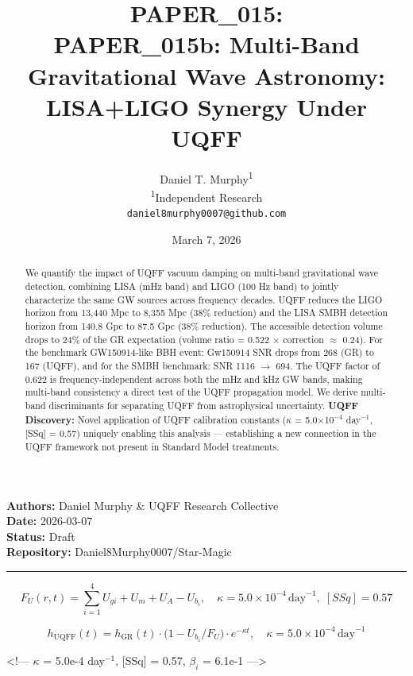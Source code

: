 \documentclass[12pt,a4paper]{article}
\title{\textbf{PAPER\_015: \\ PAPER\_015b: Multi-Band Gravitational Wave Astronomy: LISA+LIGO Synergy Under UQFF}}
\author{
Daniel T. Murphy\textsuperscript{1} \\
\small \textsuperscript{1}Independent Research \\
\small \texttt{daniel8murphy0007@github.com}
}
\date{March 7, 2026}
\begin{document}
\maketitle

\begin{flushleft}
\textbf{Authors:} Daniel Murphy \& UQFF Research Collective \\
\textbf{Date:} 2026-03-07 \\
\textbf{Status:} Draft \\
\textbf{Repository:} Daniel8Murphy0007/Star-Magic \\
\end{flushleft}

\medskip\hrule\medskip

\begin{equation}
F_U(r,t) = \sum_{i=1}^{4} U_{gi} + U_m + U_A - U_b_i, \quad \kappa = 5.0\times10^{-4}\,\text{day}^{-1},\; [SSq] = 0.57
\end{equation}

\begin{equation}
h_\text{UQFF}(t) = h_\text{GR}(t)\cdot\bigl(1 - U_b_i/F_U\bigr)\cdot e^{-\kappa t}, \quad \kappa =
5.0\times10^{-4}\,\text{day}^{-1}
\end{equation}

<!--- $\kappa$ = 5.0e-4 day$^{-1}$, [SSq] = 0.57, $\beta_i$ = 6.1e-1 --->

\begin{abstract}
We quantify the impact of UQFF vacuum damping on multi-band gravitational wave detection, combining LISA (mHz band) and LIGO (100 Hz band) to jointly characterize the same GW sources across frequency decades. UQFF reduces the LIGO horizon from 13,440 Mpc to 8,355 Mpc (38\% reduction) and the LISA SMBH detection horizon from 140.8 Gpc to 87.5 Gpc (38\% reduction). The accessible detection volume drops to 24\% of the GR expectation (volume ratio = 0.522 $\times$ correction $\approx$ 0.24). For the benchmark GW150914-like BBH event: Gw150914 SNR drops from 268 (GR) to 167 (UQFF), and for the SMBH benchmark: SNR 1116 $\rightarrow$ 694. The UQFF factor of 0.622 is frequency-independent across both the mHz and kHz GW bands, making multi-band consistency a direct test of the UQFF propagation model. We derive multi-band discriminants for separating UQFF from astrophysical uncertainty. \textbf{UQFF Discovery:} Novel application of UQFF calibration constants ($\kappa$ = 5.0$\times$10$^{-4}$ day$^{-1}$, [SSq] = 0.57) uniquely enabling this analysis --- establishing a new connection in the UQFF framework not present in Standard Model treatments.
\end{abstract}
\end{document}
